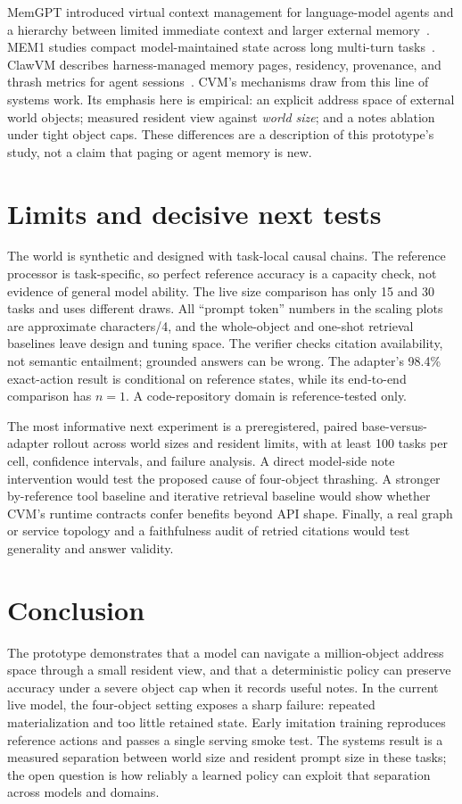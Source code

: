 \documentclass[10pt,letterpaper]{article}
\begin{document}
MemGPT introduced virtual context management for language-model agents and a hierarchy between limited immediate context and larger external memory~\cite{memgpt}. MEM1 studies compact model-maintained state across long multi-turn tasks~\cite{mem1}. ClawVM describes harness-managed memory pages, residency, provenance, and thrash metrics for agent sessions~\cite{clawvm}. CVM's mechanisms draw from this line of systems work. Its emphasis here is empirical: an explicit address space of external world objects; measured resident view against \emph{world size}; and a notes ablation under tight object caps. These differences are a description of this prototype's study, not a claim that paging or agent memory is new.

\section{Limits and decisive next tests}

The world is synthetic and designed with task-local causal chains. The reference processor is task-specific, so perfect reference accuracy is a capacity check, not evidence of general model ability. The live size comparison has only 15 and 30 tasks and uses different draws. All ``prompt token'' numbers in the scaling plots are approximate characters/4, and the whole-object and one-shot retrieval baselines leave design and tuning space. The verifier checks citation availability, not semantic entailment; grounded answers can be wrong. The adapter's 98.4\% exact-action result is conditional on reference states, while its end-to-end comparison has $n=1$. A code-repository domain is reference-tested only.

The most informative next experiment is a preregistered, paired base-versus-adapter rollout across world sizes and resident limits, with at least 100 tasks per cell, confidence intervals, and failure analysis. A direct model-side note intervention would test the proposed cause of four-object thrashing. A stronger by-reference tool baseline and iterative retrieval baseline would show whether CVM's runtime contracts confer benefits beyond API shape. Finally, a real graph or service topology and a faithfulness audit of retried citations would test generality and answer validity.

\section{Conclusion}

The prototype demonstrates that a model can navigate a million-object address space through a small resident view, and that a deterministic policy can preserve accuracy under a severe object cap when it records useful notes. In the current live model, the four-object setting exposes a sharp failure: repeated materialization and too little retained state. Early imitation training reproduces reference actions and passes a single serving smoke test. The systems result is a measured separation between world size and resident prompt size in these tasks; the open question is how reliably a learned policy can exploit that separation across models and domains.
\end{document}
